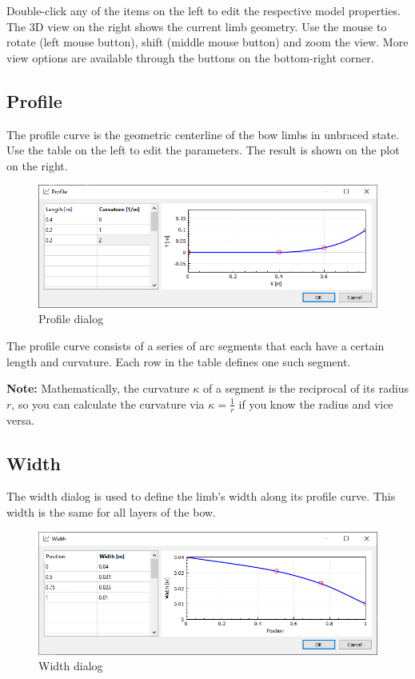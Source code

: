 \documentclass[12pt]{article}
\begin{document}
Double-click any of the items on the left to edit the respective model properties. The 3D view on the right shows the current limb geometry.
Use the mouse to rotate (left mouse button), shift (middle mouse button) and zoom the view.
More view options are available through the buttons on the bottom-right corner.

\newpage
\subsection{Profile}

The profile curve is the geometric centerline of the bow limbs in unbraced state.
Use the table on the left to edit the parameters.
The result is shown on the plot on the right.

\begin{figure}[H]
\centering
\includegraphics[width=\textwidth]{figures/screenshots/input/profile}
\caption{Profile dialog}
\label{fig:profile}
\end{figure}

The profile curve consists of a series of arc segments that each have a certain length and curvature. Each row in the table defines one such segment.

\textbf{Note:} Mathematically, the curvature $\kappa$ of a segment is the reciprocal of its radius $r$, so you can calculate the curvature via $\kappa = \frac{1}{r}$ if you know the radius and vice versa.

\newpage
\subsection{Width}

The width dialog is used to define the limb's width along its profile curve. This width is the same for all layers of the bow.

\begin{figure}[H]
\centering
\includegraphics[width=\textwidth]{figures/screenshots/input/width}
\caption{Width dialog}
\label{fig:width}
\end{figure}
\end{document}
